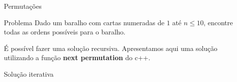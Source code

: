 \begin{frame}{Permutações}

    \begin{block}{Problema}
        Dado um baralho com cartas numeradas de $1$ até $n \leq 10$, encontre todas as ordens possíveis para o baralho.
    \end{block} \pause

    É possível fazer uma solução recursiva. Apresentamos aqui uma solução utilizando a função {\bf next permutation} do c++. \pause

    \begin{block}{Solução iterativa}
        \footnotesize
        \inputminted{cpp}{codigos/permutacoes-iterativo.cpp}    
    \end{block}

\end{frame}

